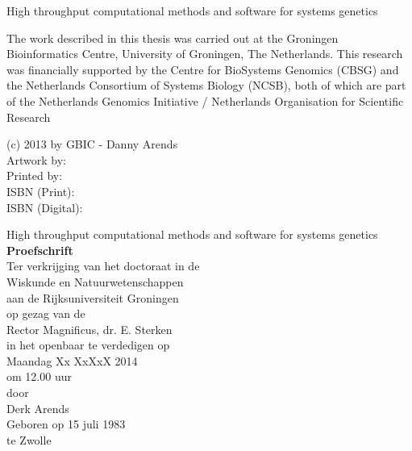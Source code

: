 \documentclass[8pt, twoside]{book}
\newcommand{\bold}[1]{{\bfseries #1}}
\newcommand{\mytitle}[1]{{\LARGE #1}}
\begin{document}
  \thispagestyle{empty}
  \begin{center}
  \mytitle{ High throughput computational methods and software for systems genetics }\\
  \end{center}
\newpage
  \thispagestyle{empty}
  \noindent The work described in this thesis was carried out at the Groningen 
  Bioinformatics Centre, University of Groningen, The Netherlands. This research 
  was financially supported by the Centre for BioSystems Genomics (CBSG) and the 
  Netherlands Consortium of Systems Biology (NCSB), both of which are part of the 
  Netherlands Genomics Initiative / Netherlands Organisation for Scientific Research\\
  \vspace{130 mm}
  
  \noindent (c) 2013 by GBIC - Danny Arends\\
  Artwork by:\\
  Printed by:\\
  ISBN (Print):\\
  ISBN (Digital):\\
\newpage

\thispagestyle{empty}
\begin{center}
  \mytitle{ High throughput computational methods and software for systems genetics }\\
    \vspace{10 mm}
  \bold{Proefschrift}\\
    \vspace{10 mm}
  Ter verkrijging van het doctoraat in de \\
  Wiskunde en Natuurwetenschappen \\
  aan de Rijksuniversiteit Groningen \\
  op gezag van de \\
  Rector Magnificus, dr. E. Sterken\\ 
  in het openbaar te verdedigen op \\
  Maandag Xx XxXxX 2014 \\
  om 12.00 uur \\
    \vspace{10 mm}
  door\\
    \vspace{10 mm}
  Derk Arends\\
    \vspace{10 mm}
  Geboren op 15 juli 1983\\
  te Zwolle
\end{center}
\end{document}
